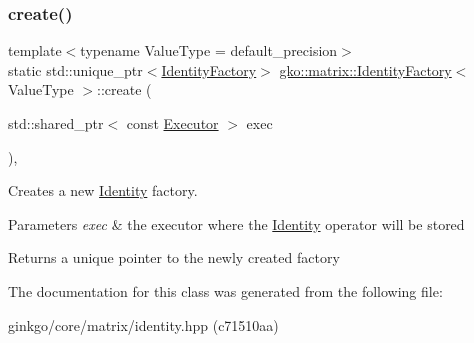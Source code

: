 \subsubsection{\texorpdfstring{create()}{create()}}
{\footnotesize\ttfamily template$<$typename Value\+Type  = default\+\_\+precision$>$ \\
static std\+::unique\+\_\+ptr$<$\hyperlink{classgko_1_1matrix_1_1IdentityFactory}{Identity\+Factory}$>$ \hyperlink{classgko_1_1matrix_1_1IdentityFactory}{gko\+::matrix\+::\+Identity\+Factory}$<$ Value\+Type $>$\+::create (\begin{DoxyParamCaption}\item[{std\+::shared\+\_\+ptr$<$ const \hyperlink{classgko_1_1Executor}{Executor} $>$}]{exec }\end{DoxyParamCaption})\hspace{0.3cm}{\ttfamily [inline]}, {\ttfamily [static]}}



Creates a new \hyperlink{classgko_1_1matrix_1_1Identity}{Identity} factory. 


\begin{DoxyParams}{Parameters}
{\em exec} & the executor where the \hyperlink{classgko_1_1matrix_1_1Identity}{Identity} operator will be stored\\
\hline
\end{DoxyParams}
\begin{DoxyReturn}{Returns}
a unique pointer to the newly created factory 
\end{DoxyReturn}


The documentation for this class was generated from the following file\+:\begin{DoxyCompactItemize}
\item 
ginkgo/core/matrix/identity.\+hpp (c71510aa)\end{DoxyCompactItemize}
